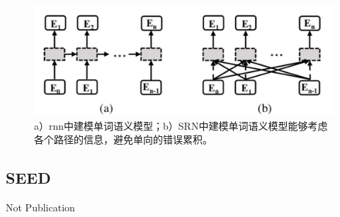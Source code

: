 \begin{figure}[H]
    \centering
    \includegraphics[width=.98\textwidth]{figure/recognition/srn_multiway.png} 
    \caption{a）rnn中建模单词语义模型；b）SRN中建模单词语义模型能够考虑各个路径的信息，避免单向的错误累积。} 
    \label{srn_multiway} 
\end{figure}

\subsection{SEED}
Not Publication